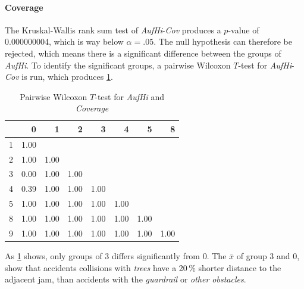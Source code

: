 \paragraph{Coverage}
The Kruskal-Wallis rank sum test of \textit{AufHi}-\textit{Cov} produces a $p$-value of 0.000000004, which is way below $\alpha=.05$. The null hypothesis can therefore be rejected, which means there is a significant difference between the groups of \textit{AufHi}. To identify the significant groups, a pairwise Wilcoxon $T$-test for \textit{AufHi}-\textit{Cov} is run, which produces \cref{tbl:wilcoxon_baysis_matched_AufHi_Cov}. 
\begin{table}[ht]
	\tiny
	\centering
    \begin{tabular}{rrrrrrrr}
        \toprule
        & 0 & 1 & 2 & 3 & 4 & 5 & 8 \\ 
        \midrule
        1 & 1.00 &  &  &  &  &  &  \\ 
        2 & 1.00 & 1.00 &  &  &  &  &  \\ 
        3 & 0.00 & 1.00 & 1.00 &  &  &  &  \\ 
        4 & 0.39 & 1.00 & 1.00 & 1.00 &  &  &  \\ 
        5 & 1.00 & 1.00 & 1.00 & 1.00 & 1.00 &  &  \\ 
        8 & 1.00 & 1.00 & 1.00 & 1.00 & 1.00 & 1.00 &  \\ 
        9 & 1.00 & 1.00 & 1.00 & 1.00 & 1.00 & 1.00 & 1.00 \\ 
        \bottomrule
      \end{tabular}
	\caption{Pairwise Wilcoxon $T$-test for \textit{AufHi} and \textit{Coverage}}
	\label{tbl:wilcoxon_baysis_matched_AufHi_Cov}
\end{table}
As \cref{tbl:wilcoxon_baysis_matched_AufHi_Cov} shows, only groups of 3 differs significantly from 0. The $\bar{x}$ of group 3 and 0, show that accidents collisions with \textit{trees} have a 20\,\% shorter distance to the adjacent jam, than accidents with the \textit{guardrail} or \textit{other obstacles}.
